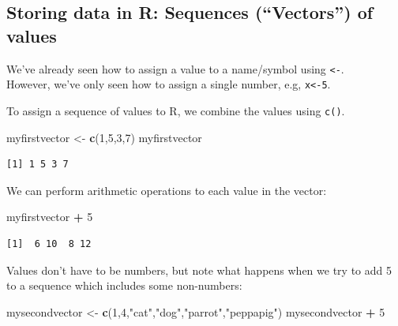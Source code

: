\documentclass[]{book}
\newenvironment{Shaded}{\begin{snugshade}}{\end{snugshade}}
\newcommand{\DecValTok}[1]{\textcolor[rgb]{0.00,0.00,0.81}{#1}}
\newcommand{\KeywordTok}[1]{\textcolor[rgb]{0.13,0.29,0.53}{\textbf{#1}}}
\newcommand{\NormalTok}[1]{#1}
\newcommand{\OperatorTok}[1]{\textcolor[rgb]{0.81,0.36,0.00}{\textbf{#1}}}
\newcommand{\StringTok}[1]{\textcolor[rgb]{0.31,0.60,0.02}{#1}}
\begin{document}
\hypertarget{storing-data-in-r-sequences-vectors-of-values}{%
\subsection*{Storing data in R: Sequences (``Vectors'') of values}\label{storing-data-in-r-sequences-vectors-of-values}}

We've already seen how to assign a value to a name/symbol using \texttt{\textless{}-}.\\
However, we've only seen how to assign a single number, e.g, \texttt{x\textless{}-5}.

To assign a sequence of values to R, we combine the values using \texttt{c()}.

\begin{Shaded}
\begin{Highlighting}[]
\NormalTok{myfirstvector <-}\StringTok{ }\KeywordTok{c}\NormalTok{(}\DecValTok{1}\NormalTok{,}\DecValTok{5}\NormalTok{,}\DecValTok{3}\NormalTok{,}\DecValTok{7}\NormalTok{)}
\NormalTok{myfirstvector}
\end{Highlighting}
\end{Shaded}

\begin{verbatim}
[1] 1 5 3 7
\end{verbatim}

We can perform arithmetic operations to each value in the vector:

\begin{Shaded}
\begin{Highlighting}[]
\NormalTok{myfirstvector }\OperatorTok{+}\StringTok{ }\DecValTok{5}
\end{Highlighting}
\end{Shaded}

\begin{verbatim}
[1]  6 10  8 12
\end{verbatim}

Values don't have to be numbers, but note what happens when we try to add 5 to a sequence which includes some non-numbers:

\begin{Shaded}
\begin{Highlighting}[]
\NormalTok{mysecondvector <-}\StringTok{ }\KeywordTok{c}\NormalTok{(}\DecValTok{1}\NormalTok{,}\DecValTok{4}\NormalTok{,}\StringTok{"cat"}\NormalTok{,}\StringTok{"dog"}\NormalTok{,}\StringTok{"parrot"}\NormalTok{,}\StringTok{"peppapig"}\NormalTok{)}
\NormalTok{mysecondvector }\OperatorTok{+}\StringTok{ }\DecValTok{5}
\end{Highlighting}
\end{Shaded}
\end{document}
